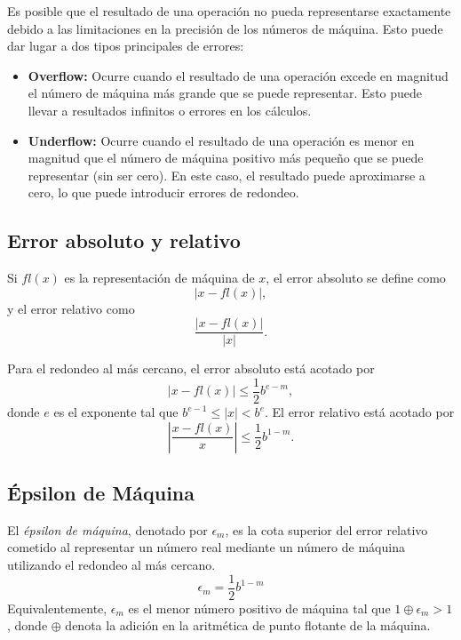 \documentclass[12pt]{article}
\begin{document}
Es posible que el resultado de una operación no pueda representarse exactamente debido a las limitaciones en la precisión de los números de máquina. Esto puede dar lugar a dos tipos principales de errores:

\begin{itemize}
    \item \textbf{Overflow:} Ocurre cuando el resultado de una operación excede en magnitud el número de máquina más grande que se puede representar. Esto puede llevar a resultados infinitos o errores en los cálculos.
    \item \textbf{Underflow:} Ocurre cuando el resultado de una operación es menor en magnitud que el número de máquina positivo más pequeño que se puede representar (sin ser cero). En este caso, el resultado puede aproximarse a cero, lo que puede introducir errores de redondeo.
\end{itemize}

\subsection{Error absoluto y relativo}

\begin{definition}
    Si $fl(x)$ es la representación de máquina de $x$, el error absoluto se define como 
    $$|x - fl(x)|,$$
    y el error relativo como 
    $$\frac{|x - fl(x)|}{|x|}.$$
\end{definition}

Para el redondeo al más cercano, el error absoluto está acotado por
$$|x - fl(x)| \leq \frac{1}{2} b^{e-m},$$ donde $e$ es el exponente tal que $b^{e-1} \le |x| < b^e$. El error relativo está acotado por
$$
    \left| \frac{x - fl(x)}{x} \right| \le \frac{1}{2} b^{1-m}.
$$

\subsection{Épsilon de Máquina}

\begin{definition}
    El \emph{épsilon de máquina}, denotado por $\epsilon_m$, es la cota superior del error relativo cometido al representar un número real mediante un número de máquina utilizando el redondeo al más cercano.
    $$
        \epsilon_m = \frac{1}{2} b^{1-m}
    $$
    Equivalentemente, $\epsilon_m$ es el menor número positivo de máquina tal que $1 \oplus \epsilon_m > 1$, donde $\oplus$ denota la adición en la aritmética de punto flotante de la máquina.
\end{definition}
\end{document}

